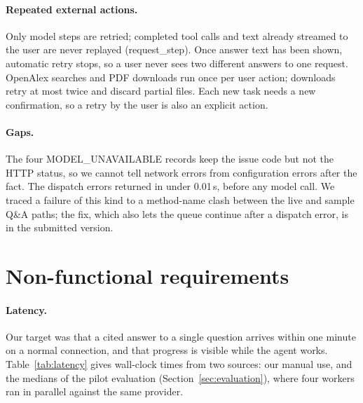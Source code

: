 \documentclass{article}
\newcommand{\code}[1]{{\ttfamily\small\hyphenchar\font=-1\relax #1}}
\begin{document}
\paragraph{Repeated external actions.}
Only model steps are retried; completed tool calls and text already streamed to the user are never
replayed (\code{request\_step}). Once answer text has been shown, automatic retry stops, so a user never
sees two different answers to one request. OpenAlex searches and PDF downloads run once per user
action; downloads retry at most twice and discard partial files. Each new task needs a new
confirmation, so a retry by the user is also an explicit action.

\paragraph{Gaps.} The four \code{MODEL\_UNAVAILABLE} records keep the issue code but not the HTTP status,
so we cannot tell network errors from configuration errors after the fact. The dispatch errors
returned in under 0.01\,s, before any model call. We traced a failure of this kind to a method-name
clash between the live and sample Q\&A paths; the fix, which also lets the queue continue after a
dispatch error, is in the submitted version.

\section{Non-functional requirements}
\label{sec:nfr}
\paragraph{Latency.} Our target was that a cited answer to a single question arrives within one minute
on a normal connection, and that progress is visible while the agent works. Table~\ref{tab:latency}
gives wall-clock times from two sources: our manual use, and the medians of the pilot evaluation
(Section~\ref{sec:evaluation}), where four workers ran in parallel against the same provider.
\end{document}
